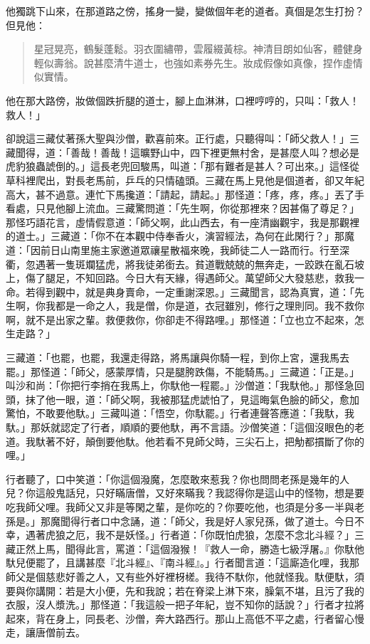 他獨跳下山來，在那道路之傍，搖身一變，變做個年老的道者。真個是怎生打扮？但見他：
\begin{quote}
星冠晃亮，鶴髮蓬鬆。羽衣圍繡帶，雲履綴黃棕。神清目朗如仙客，體健身輕似壽翁。說甚麼清牛道士，也強如素券先生。妝成假像如真像，捏作虛情似實情。
\end{quote}

他在那大路傍，妝做個跌折腿的道士，腳上血淋淋，口裡哼哼的，只叫：「救人！救人！」

卻說這三藏仗著孫大聖與沙僧，歡喜前來。正行處，只聽得叫：「師父救人！」三藏聞得，道：「善哉！善哉！這曠野山中，四下裡更無村舍，是甚麼人叫？想必是虎豹狼蟲諕倒的。」這長老兜回駿馬，叫道：「那有難者是甚人？可出來。」這怪從草科裡爬出，對長老馬前，乒乓的只情磕頭。三藏在馬上見他是個道者，卻又年紀高大，甚不過意。連忙下馬攙道：「請起，請起。」那怪道：「疼，疼，疼。」丟了手看處，只見他腳上流血。三藏驚問道：「先生啊，你從那裡來？因甚傷了尊足？」那怪巧語花言，虛情假意道：「師父啊，此山西去，有一座清幽觀宇，我是那觀裡的道士。」三藏道：「你不在本觀中侍奉香火，演習經法，為何在此閑行？」那魔道：「因前日山南里施主家邀道眾禳星散福來晚，我師徒二人一路而行。行至深衢，忽遇著一隻斑斕猛虎，將我徒弟銜去。貧道戰兢兢的無奔走，一跤跌在亂石坡上，傷了腿足，不知回路。今日大有天緣，得遇師父。萬望師父大發慈悲，救我一命。若得到觀中，就是典身賣命，一定重謝深恩。」三藏聞言，認為真實，道：「先生啊，你我都是一命之人，我是僧，你是道，衣冠雖別，修行之理則同。我不救你啊，就不是出家之輩。救便救你，你卻走不得路哩。」那怪道：「立也立不起來，怎生走路？」

三藏道：「也罷，也罷，我還走得路，將馬讓與你騎一程，到你上宮，還我馬去罷。」那怪道：「師父，感蒙厚情，只是腿胯跌傷，不能騎馬。」三藏道：「正是。」叫沙和尚：「你把行李捎在我馬上，你馱他一程罷。」沙僧道：「我馱他。」那怪急回頭，抹了他一眼，道：「師父啊，我被那猛虎諕怕了，見這晦氣色臉的師父，愈加驚怕，不敢要他馱。」三藏叫道：「悟空，你馱罷。」行者連聲答應道：「我馱，我馱。」那妖就認定了行者，順順的要他馱，再不言語。沙僧笑道：「這個沒眼色的老道。我馱著不好，顛倒要他馱。他若看不見師父時，三尖石上，把觔都摜斷了你的哩。」

行者聽了，口中笑道：「你這個潑魔，怎麼敢來惹我？你也問問老孫是幾年的人兒？你這般鬼話兒，只好瞞唐僧，又好來瞞我？我認得你是這山中的怪物，想是要吃我師父哩。我師父又非是等閑之輩，是你吃的？你要吃他，也須是分多一半與老孫是。」那魔聞得行者口中念誦，道：「師父，我是好人家兒孫，做了道士。今日不幸，遇著虎狼之厄，我不是妖怪。」行者道：「你既怕虎狼，怎麼不念北斗經？」三藏正然上馬，聞得此言，罵道：「這個潑猴！『救人一命，勝造七級浮屠。』你馱他馱兒便罷了，且講甚麼『北斗經』、『南斗經』。」行者聞言道：「這廝造化哩，我那師父是個慈悲好善之人，又有些外好裡枒槎。我待不馱你，他就怪我。馱便馱，須要與你講開：若是大小便，先和我說；若在脊梁上淋下來，臊氣不堪，且污了我的衣服，沒人漿洗。」那怪道：「我這般一把子年紀，豈不知你的話說？」行者才拉將起來，背在身上，同長老、沙僧，奔大路西行。那山上高低不平之處，行者留心慢走，讓唐僧前去。

